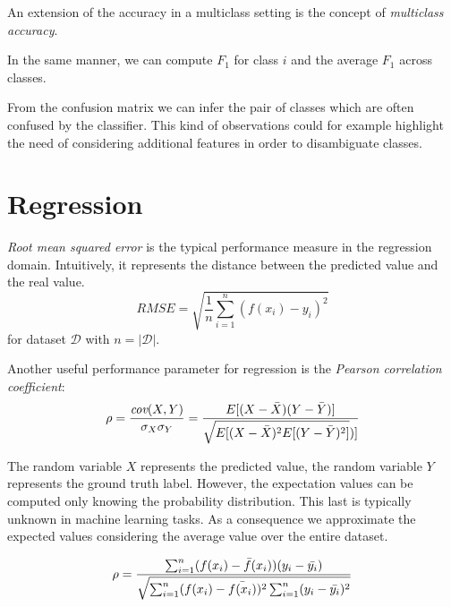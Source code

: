 An extension of the accuracy in a multiclass setting is the concept of \textit{multiclass
accuracy}.


In the same manner, we can compute $F_{1}$ for class $i$ and the average $F_{1}$
across classes.
\newline

From the confusion matrix we can infer the pair of classes which are often confused
by the classifier. This kind of observations could for example highlight the
need of considering additional features in order to disambiguate classes.

\section{Regression}
\textit{Root mean squared error} is the typical performance measure in the regression
domain. Intuitively, it represents the distance between the predicted value and the
real value.
\begin{equation}
	\textit{RMSE}= \sqrt{\frac{1}{n}\sum_{i=1}^{n}(f(x_{i})-y_{i})^{2}}
\end{equation}
for dataset $\mathcal{D}$ with $n=|\mathcal{D}|$.
\newline

Another useful performance parameter for regression is the \textit{Pearson
correlation coefficient}:
\begin{equation*}
	\rho = \frac{\textit{cov}(X,Y)}{\sigma_{X}\sigma_{Y}}= \frac{E[(X-\Bar{X})(Y-\Bar{Y})]}{\sqrt{E[(X-\Bar{X})^{2}E[(Y-\Bar{Y})^{2}]})]}
\end{equation*}

The random variable $X$ represents the predicted value, the random variable $Y$
represents the ground truth label. However, the expectation values can be
computed only knowing the probability distribution. This last is typically unknown
in machine learning tasks. As a consequence we approximate the expected values
considering the average value over the entire dataset.

\begin{equation}
	\rho = \frac{\sum_{i=1}^{n}(f(x_{i})-\Bar{f}(x_{i}))(y_{i}-\Bar{y_i})}{\sqrt{\sum_{i=1}^{n}(f(x_{i})-\Bar{f(x_i)})^{2}\sum_{i=1}^{n}(y_{i}-
	\Bar{y_i})^{2}}}
\end{equation}

